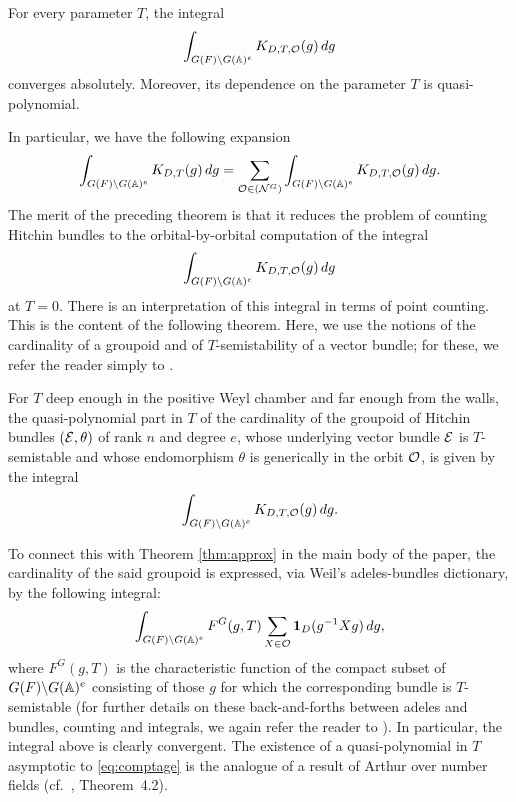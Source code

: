 \begin{paragr}
\begin{theoreme}
For every parameter $T$, the integral 
$$\int_{G(F)\backslash G(\mathbb{A})^e}   K_{D,T,\mathcal{O}}(g)\, dg$$
converges absolutely. Moreover, its dependence on the parameter $T$ is quasi-polynomial.
\end{theoreme}

In particular, we have the following expansion
$$\int_{G(F)\backslash G(\mathbb{A})^e}   K_{D,T}(g)\, dg=\sum_{\mathcal{O}\in (\mathcal{N}^G)}\int_{G(F)\backslash G(\mathbb{A})^e}   K_{D,T,\mathcal{O}}(g)\, dg.$$
The merit of the preceding theorem is that it reduces the problem of counting Hitchin bundles to the orbital-by-orbital computation of the integral 
$$\int_{G(F)\backslash G(\mathbb{A})^e}   K_{D,T,\mathcal{O}}(g)\, dg$$
at $T=0$. There is an interpretation of this integral in terms of point counting. This is the content of the following theorem. Here, we use the notions of the cardinality of a groupoid and of $T$-semistability of a vector bundle; for these, we refer the reader simply to \cite{scfh}.

\begin{theoreme}\label{thm-intro:approx}
  For $T$ deep enough in the positive Weyl chamber and far enough from the walls, the quasi-polynomial part in $T$ of the cardinality of the groupoid of Hitchin bundles $(\mathcal{E},\theta)$ of rank $n$ and degree $e$, whose underlying vector bundle $\mathcal{E}$ is $T$-semistable and whose endomorphism $\theta$ is generically in the orbit $\mathcal{O}$, is given by the integral 
  \begin{equation}\label{eq:KOduthm}
    \int_{G(F)\backslash G(\mathbb{A})^e}   K_{D,T,\mathcal{O}}(g)\, dg.
  \end{equation}
\end{theoreme}

To connect this with Theorem \ref{thm:approx} in the main body of the paper, the cardinality of the said groupoid is expressed, via Weil's adeles-bundles dictionary, by the following integral:
\begin{equation}\label{eq:comptage}
  \int_{G(F)\backslash G(\mathbb{A})^e}   F^G(g,T) \sum_{X\in \mathcal{O}} \mathbf{1}_D(g^{-1}Xg) \, dg,
\end{equation}
where $F^G(g,T)$ is the characteristic function of the compact subset of $G(F)\backslash G(\mathbb{A})^e$ consisting of those $g$ for which the corresponding bundle is $T$-semistable (for further details on these back-and-forths between adeles and bundles, counting and integrals, we again refer the reader to \cite{scfh}). In particular, the integral above is clearly convergent. The existence of a quasi-polynomial in $T$ asymptotic to \eqref{eq:comptage} is the analogue of a result of Arthur over number fields (cf.\ \cite{ar-mesure}, Theorem~4.2).


\end{paragr}
